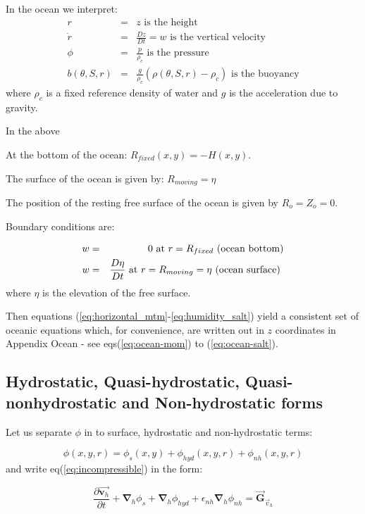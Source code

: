 In the ocean we interpret: 
\begin{eqnarray}
r &=&z\text{ is the height}  \label{eq:ocean-z} \\
\dot{r} &=&\frac{Dz}{Dt}=w\text{ is the vertical velocity}
\label{eq:ocean-w} \\
\phi &=&\frac{p}{\rho _{c}}\text{ is the pressure}  \label{eq:ocean-p} \\
b(\theta ,S,r) &=&\frac{g}{\rho _{c}}\left( \rho (\theta ,S,r)-\rho
_{c}\right) \text{ is the buoyancy}  \label{eq:ocean-b}
\end{eqnarray}
where $\rho _{c}$ is a fixed reference density of water and $g$ is the
acceleration due to gravity.\noindent

In the above

At the bottom of the ocean: $R_{fixed}(x,y)=-H(x,y)$.

The surface of the ocean is given by: $R_{moving}=\eta $

The position of the resting free surface of the ocean is given by $
R_{o}=Z_{o}=0$.

Boundary conditions are:

\begin{eqnarray}
w &=&0~\text{at }r=R_{fixed}\text{ (ocean bottom)}  \label{eq:fixed-bc-ocean}
\\
w &=&\frac{D\eta }{Dt}\text{ at }r=R_{moving}=\eta \text{ (ocean surface) 
\label{eq:moving-bc-ocean}}
\end{eqnarray}
where $\eta $ is the elevation of the free surface.

Then equations (\ref{eq:horizontal_mtm}-\ref{eq:humidity_salt}) yield a consistent set 
of oceanic equations
which, for convenience, are written out in $z$ coordinates in Appendix Ocean
- see eqs(\ref{eq:ocean-mom}) to (\ref{eq:ocean-salt}).

\subsection{Hydrostatic, Quasi-hydrostatic, Quasi-nonhydrostatic and
Non-hydrostatic forms}

Let us separate $\phi $ in to surface, hydrostatic and non-hydrostatic terms:

\begin{equation}
\phi (x,y,r)=\phi _{s}(x,y)+\phi _{hyd}(x,y,r)+\phi _{nh}(x,y,r)
\label{eq:phi-split}
\end{equation}
and write eq(\ref{eq:incompressible}) in the form:

\begin{equation}
\frac{\partial \vec{\mathbf{v}_{h}}}{\partial t}+\mathbf{\nabla }_{h}\phi
_{s}+\mathbf{\nabla }_{h}\phi _{hyd}+\epsilon _{nh}\mathbf{\nabla }_{h}\phi
_{nh}=\vec{\mathbf{G}}_{\vec{v}_{h}}  \label{eq:mom-h}
\end{equation}

